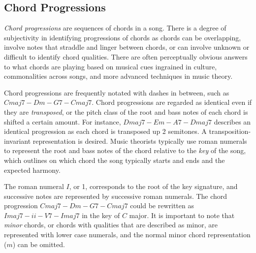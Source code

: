 \subsection{Chord Progressions}

\textit{Chord progressions} are sequences of chords in a song. There is a degree of subjectivity in identifying progressions of chords as chords can be overlapping, involve notes that straddle and linger between chords, or can involve unknown or difficult to identify chord qualities. There are often perceptually obvious answers to what chords are playing based on musical cues ingrained in culture, commonalities across songs, and more advanced techniques in music theory.

Chord progressions are frequently notated with dashes in between, such as $Cmaj7 - Dm - G7 - Cmaj7$. Chord progressions are regarded as identical even if they are \textit{transposed}, or the pitch class of the root and bass notes of each chord is shifted a certain amount. For instance, $Dmaj7 - Em - A7 - Dmaj7$ describes an identical progression as each chord is transposed up 2 semitones. A transposition-invariant representation is desired. Music theorists typically use roman numerals to represent the root and bass notes of the chord relative to the \textit{key} of the song, which outlines on which chord the song typically starts and ends and the expected harmony.

The roman numeral $I$, or 1, corresponds to the root of the key signature, and successive notes are represented by successive roman numerals. The chord progression $Cmaj7 - Dm - G7 - Cmaj7$ could be rewritten as $Imaj7 - ii - V7 - Imaj7$ in the key of $C$ major. It is important to note that \textit{minor} chords, or chords with qualities that are described as minor, are represented with lower case numerals, and the normal minor chord representation ($m$) can be omitted.
